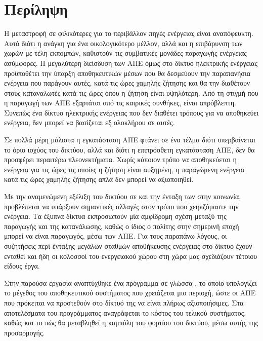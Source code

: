 \documentclass[12pt]{report}
\begin{document}
\chapter*{Περίληψη}
Η μεταστροφή σε φιλικότερες για το περιβάλλον πηγές ενέργειας είναι αναπόφευκτη. Αυτό διότι η ανάγκη για ένα οικολογικότερο μέλλον, αλλά και η επιβάρυνση των χωρών με τέλη εκπομπών, καθιστούν τις συμβατικές μονάδες 
παραγωγής ενέργειας ασύμφορες. Η μεγαλύτερη διείσδυση των ΑΠΕ όμως στο δίκτυο ηλεκτρικής ενέργειας προϋποθέτει την ύπαρξη αποθηκευτικών μέσων που θα δεσμεύουν την παραπανήσια ενέργεια που παράγουν αυτές, κατά τις ώρες χαμηλής 
ζήτησης και θα την διαθέτουν στους καταναλωτές κατά τις ώρες όπου η ζήτηση είναι υψηλότερη. Από τη στιγμή που η παραγωγή των ΑΠΕ εξαρτάται από τις καιρικές συνθήκες, είναι απρόβλεπτη. Συνεπώς ένα δίκτυο ηλεκτρικής ενέργειας 
που δεν διαθέτει τρόπους για να αποθηκεύει ενέργεια, δεν μπορεί να βασίζεται εξ ολοκλήρου σε αυτές.

Σε πολλά μέρη μάλιστα η εγκατάσταση ΑΠΕ φτάνει σε ένα τέλμα διότι υπερβαίνεται το όριο ισχύος του δικτύου, αλλά και διότι η επιπρόσθετη εγκατάσταση ΑΠΕ, δεν θα προσφέρει περαιτέρω πλεονεκτήματα. Χωρίς κάποιον τρόπο να αποθηκεύεται
η ενέργεια για τις ώρες τις οποίες η ζήτηση είναι αυξημένη, η παραγώμενη ενέργεια κατά τις ώρες χαμηλής ζήτησης απλά δεν μπορεί να αξιοποιηθεί. 

Με την αναμενώμενη εξέλιξη του δικτύου σε {} και την ένταξη των {} στην κοινωνία, προβλέπεται να υπάρξουν σημαντικές αλλαγές στον τρόπο που χειριζόμαστε την ενέργεια. Τα έξυπνα δίκτυα 
εκπροσωπούν μία αμφίδρομη σχέση μεταξύ της παραγωγής και της κατανάλωσης, καθώς ο ίδιος ο πολίτης στην σημερινή εποχή μπορεί να είναι παραγωγός, μέσω των ΑΠΕ. Για τους παραπάνω λόγους, οι συζητήσεις περί ένταξης μεγάλων σταθμών 
αποθήκευσης ενέργειας στο δίκτυο έχουν ενταθεί και ήδη οι κολοσσοί του ενεργειακού χώρου στη χώρα μας σχεδιάζουν τέτοιου είδους έργα. 

Στην παρούσα εργασία αναπτύχθηκε ένα πρόγραμμα σε γλώσσα {}, το οποίο υπολογίζει το μέγεθος του αποθηκευτικού συστήματος που χρειάζεται μια περιοχή, ώστε οι ΑΠΕ που πρόκειται να προστεθούν στο δίκτυό της να είναι
πλήρως αξιοποιήσιμες. Στα αποτελέσματα του προγράμματος αναγράφεται το κόστος του τελικού συστήματος, καθώς και το πώς θα μεταβληθεί η καμπύλη του φορτίου του δικτύου, μέσω αυτής της προσαρμογής.
\end{document}
